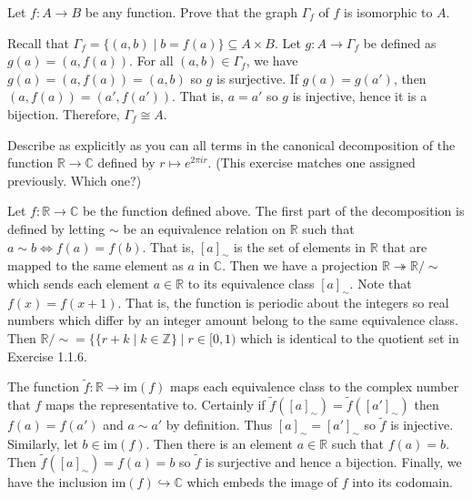 \documentclass[../../master.tex]{subfiles}
\begin{document}
  \begin{problem}
    Let \(f: A \to B\) be any function. Prove that the graph \(\Gamma_{f}\) of \(f\) is isomorphic to \(A\).
  \end{problem}

  \begin{solution}
    Recall that \(\Gamma_{f} = \{(a, b) \mid b = f(a)\} \subseteq A \times B\).
    Let \(g: A \to \Gamma_{f}\) be defined as \(g(a) = (a, f(a))\).
    For all \((a, b) \in \Gamma_{f}\), we have \(g(a) = (a, f(a)) = (a, b)\) so \(g\) is surjective.
    If \(g(a) = g(a')\), then \((a, f(a)) = (a', f(a'))\).
    That is, \(a = a'\) so \(g\) is injective, hence it is a bijection.
    Therefore, \(\Gamma_{f} \cong A\).
  \end{solution}

  \begin{problem}
    Describe as explicitly as you can all terms in the canonical decomposition of the function \(\mathbb{R} \to \mathbb{C}\) defined by \(r \mapsto e^{2\pi ir}\).
    (This exercise matches one assigned previously. Which one?)
  \end{problem}

  \begin{solution}
    Let \(f: \mathbb{R} \to \mathbb{C}\) be the function defined above.
    The first part of the decomposition is defined by letting \(\sim\) be an equivalence relation on \(\mathbb{R}\) such that \(a \sim b \Longleftrightarrow f(a) = f(b)\).
    That is, \([a]_{\sim}\) is the set of elements in \(\mathbb{R}\) that are mapped to the same element as \(a\) in \(\mathbb{C}\).
    Then we have a projection \(\mathbb{R} \twoheadrightarrow \mathbb{R} / {\sim}\) which sends each element \(a \in \mathbb{R}\) to its equivalence class \([a]_{\sim}\).
    Note that \(f(x) = f(x+1)\). That is, the function is periodic about the integers so real numbers which differ by an integer amount belong to the same equivalence class.
    Then \(\mathbb{R} / {\sim} = \{ \{r + k \mid k \in \mathbb{Z} \} \mid r \in [0, 1)\) which is identical to the quotient set in Exercise 1.1.6.

    The function \(\tilde{f}: \mathbb{R} \to \text{im}(f)\) maps each equivalence class to the complex number that \(f\) maps the representative to.
    Certainly if \(\tilde{f}([a]_{\sim}) = \tilde{f}([a']_{\sim})\) then \(f(a) = f(a')\) and \(a \sim a'\) by definition.
    Thus \([a]_{\sim} = [a']_{\sim}\) so \(\tilde{f}\) is injective.
    Similarly, let \(b \in \text{im}(f)\). Then there is an element \(a \in \mathbb{R}\) such that \(f(a) = b\).
    Then \(\tilde{f}([a]_{\sim}) = f(a) = b\) so \(\tilde{f}\) is surjective and hence a bijection.
    Finally, we have the inclusion \(\text{im}(f) \hookrightarrow \mathbb{C}\) which embeds the image of \(f\) into its codomain.
  \end{solution}
\end{document}
